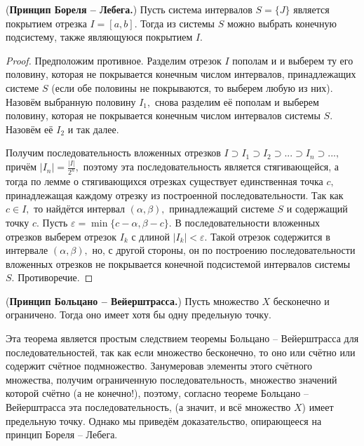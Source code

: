 \begin{theorem} (\textbf{Принцип Бореля -- Лебега.})
    Пусть система интервалов $S=\{J\}$ является покрытием
    отрезка $I=[a, b].$ Тогда из системы $S$ можно
    выбрать конечную подсистему, также являющуюся
    покрытием $I.$
\end{theorem}
\begin{proof}
    Предположим противное. Разделим отрезок
    $I$ пополам и и выберем ту его половину,
    которая не покрывается конечным числом
    интервалов, принадлежащих системе $S$
    (если обе половины не покрываются,
    то выберем любую из них).
    Назовём выбранную половину $I_1,$ снова
    разделим её пополам и выберем половину,
    которая не покрывается конечным числом
    интервалов системы $S.$ Назовём её $I_2$
    и так далее.

    Получим последовательность вложенных отрезков
    $
        I\supset I_1\supset I_2\supset...\supset I_n\supset...,
    $
    причём $|I_n|=\frac{|I|}{2^n},$ поэтому
    эта последовательность является стягивающейся,
    а тогда по лемме о стягивающихся
    отрезках существует единственная точка $c,$
    принадлежащая каждому отрезку из построенной
    последовательности. Так как $c\in I,$ то найдётся
    интервал $(\alpha, \beta),$ принадлежащий
    системе $S$ и содержащий точку $c.$
    Пусть $\varepsilon=\min\{c-\alpha, \beta-c\}.$
    В последовательности вложенных отрезков выберем
    отрезок $I_k$ с длиной $|I_k|<\varepsilon.$ Такой
    отрезок содержится в интервале $(\alpha, \beta),$
    но, с другой стороны, он по построению
    последовательности вложенных отрезков не покрывается
    конечной подсистемой интервалов системы $S.$ Противоречие.
\end{proof}
\begin{theorem} (\textbf{Принцип Больцано -- Вейерштрасса.})
    Пусть множество $X$ бесконечно и ограничено. Тогда оно
    имеет хотя бы одну предельную точку.
\end{theorem}
Эта теорема является простым следствием
теоремы Больцано -- Вейерштрасса для
последовательностей, так как если множество
бесконечно, то оно или счётно или содержит
счётное подмножество. Занумеровав элементы
этого счётного множества, получим ограниченную
последовательность, множество значений
которой счётно (а не конечно!), поэтому,
согласно теореме Больцано -- Вейерштрасса
эта последовательность,
(а значит, и всё множество $X$) имеет предельную точку.
Однако мы приведём доказательство, опирающееся
на принцип Бореля -- Лебега.
